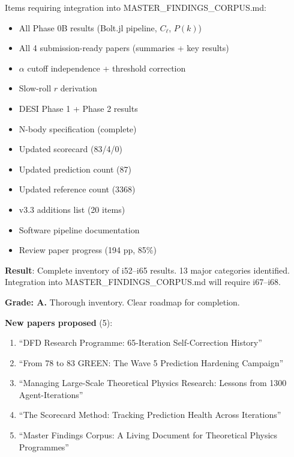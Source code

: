 \documentclass[11pt,a4paper]{article}
\begin{document}
Items requiring integration into MASTER\_FINDINGS\_CORPUS.md:
\begin{itemize}
\item All Phase 0B results (Bolt.jl pipeline, $C_\ell$, $P(k)$)
\item All 4 submission-ready papers (summaries + key results)
\item $\alpha$ cutoff independence + threshold correction
\item Slow-roll $r$ derivation
\item DESI Phase 1 + Phase 2 results
\item N-body specification (complete)
\item Updated scorecard (83/4/0)
\item Updated prediction count (87)
\item Updated reference count (3368)
\item v3.3 additions list (20 items)
\item Software pipeline documentation
\item Review paper progress (194 pp, 85\%)
\end{itemize}

\begin{tcolorbox}[colback=green!5!white, colframe=green!60!black, title={Agent 7: Master Findings Compilation BEGUN}]
\textbf{Result}: Complete inventory of i52--i65 results. 13 major categories identified. Integration into MASTER\_FINDINGS\_CORPUS.md will require i67--i68.

\textbf{Grade: A.} Thorough inventory. Clear roadmap for completion.

\textbf{New papers proposed} (5):
\begin{enumerate}
\item ``DFD Research Programme: 65-Iteration Self-Correction History''
\item ``From 78 to 83 GREEN: The Wave 5 Prediction Hardening Campaign''
\item ``Managing Large-Scale Theoretical Physics Research: Lessons from 1300 Agent-Iterations''
\item ``The Scorecard Method: Tracking Prediction Health Across Iterations''
\item ``Master Findings Corpus: A Living Document for Theoretical Physics Programmes''
\end{enumerate}
\end{tcolorbox}
\end{document}
